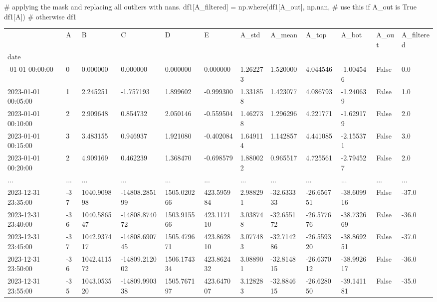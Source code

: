 \documentclass[
  letterpaper,
  DIV=11,
  numbers=noendperiod,
  oneside]{scrreprt}
\newenvironment{Shaded}{\begin{snugshade}}{\end{snugshade}}
\newcommand{\CommentTok}[1]{\textcolor[rgb]{0.37,0.37,0.37}{#1}}
\newcommand{\NormalTok}[1]{\textcolor[rgb]{0.00,0.23,0.31}{#1}}
\newcommand{\OperatorTok}[1]{\textcolor[rgb]{0.37,0.37,0.37}{#1}}
\newcommand{\StringTok}[1]{\textcolor[rgb]{0.13,0.47,0.30}{#1}}
\begin{document}
\begin{Shaded}
\begin{Highlighting}[]
\CommentTok{\# applying the mask and replacing all outliers with nans.}
\NormalTok{df1[}\StringTok{\textquotesingle{}A\_filtered\textquotesingle{}}\NormalTok{] }\OperatorTok{=}\NormalTok{ np.where(df1[}\StringTok{\textquotesingle{}A\_out\textquotesingle{}}\NormalTok{],}
\NormalTok{                                np.nan,  }\CommentTok{\# use this if A\_out is True}
\NormalTok{                                df1[}\StringTok{\textquotesingle{}A\textquotesingle{}}\NormalTok{]) }\CommentTok{\# otherwise}
\NormalTok{df1}
                            
\end{Highlighting}
\end{Shaded}

\begin{longtable}[]{@{}llllllllllll@{}}
\toprule\noalign{}
& A & B & C & D & E & A\_std & A\_mean & A\_top & A\_bot & A\_out &
A\_filtered \\
date & & & & & & & & & & & \\
\midrule\noalign{}
\endhead
\bottomrule\noalign{}
\endlastfoot
2023-01-01 00:00:00 & 0 & 0.000000 & 0.000000 & 0.000000 & 0.000000 &
1.262273 & 1.520000 & 4.044546 & -1.004546 & False & 0.0 \\
2023-01-01 00:05:00 & 1 & 2.245251 & -1.757193 & 1.899602 & -0.999300 &
1.331858 & 1.423077 & 4.086793 & -1.240639 & False & 1.0 \\
2023-01-01 00:10:00 & 2 & 2.909648 & 0.854732 & 2.050146 & -0.559504 &
1.462738 & 1.296296 & 4.221771 & -1.629179 & False & 2.0 \\
2023-01-01 00:15:00 & 3 & 3.483155 & 0.946937 & 1.921080 & -0.402084 &
1.649114 & 1.142857 & 4.441085 & -2.155371 & False & 3.0 \\
2023-01-01 00:20:00 & 2 & 4.909169 & 0.462239 & 1.368470 & -0.698579 &
1.880022 & 0.965517 & 4.725561 & -2.794527 & False & 2.0 \\
... & ... & ... & ... & ... & ... & ... & ... & ... & ... & ... & ... \\
2023-12-31 23:35:00 & -37 & 1040.909898 & -14808.285199 & 1505.020266 &
423.595984 & 2.988291 & -32.633333 & -26.656751 & -38.609916 & False &
-37.0 \\
2023-12-31 23:40:00 & -36 & 1040.586547 & -14808.874072 & 1503.915566 &
423.117110 & 3.038748 & -32.655172 & -26.577676 & -38.732669 & False &
-36.0 \\
2023-12-31 23:45:00 & -37 & 1042.937417 & -14808.690745 & 1505.479671 &
423.862810 & 3.077483 & -32.714286 & -26.559320 & -38.869251 & False &
-37.0 \\
2023-12-31 23:50:00 & -36 & 1042.411572 & -14809.212002 & 1506.174334 &
423.862432 & 3.088901 & -32.814815 & -26.637012 & -38.992617 & False &
-36.0 \\
2023-12-31 23:55:00 & -35 & 1043.053520 & -14809.990338 & 1505.767197 &
423.647007 & 3.128283 & -32.884615 & -26.628050 & -39.141181 & False &
-35.0 \\
\end{longtable}
\end{document}
